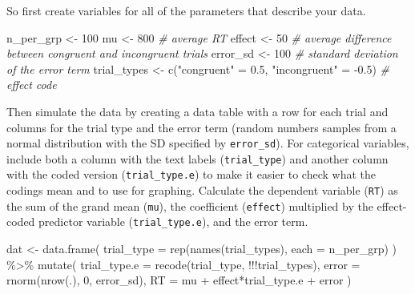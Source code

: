 \documentclass[
  oneside]{book}
\newenvironment{Shaded}{\begin{snugshade}}{\end{snugshade}}
\newcommand{\AttributeTok}[1]{\textcolor[rgb]{0.77,0.63,0.00}{#1}}
\newcommand{\CommentTok}[1]{\textcolor[rgb]{0.56,0.35,0.01}{\textit{#1}}}
\newcommand{\DecValTok}[1]{\textcolor[rgb]{0.00,0.00,0.81}{#1}}
\newcommand{\FloatTok}[1]{\textcolor[rgb]{0.00,0.00,0.81}{#1}}
\newcommand{\FunctionTok}[1]{\textcolor[rgb]{0.00,0.00,0.00}{#1}}
\newcommand{\NormalTok}[1]{#1}
\newcommand{\OtherTok}[1]{\textcolor[rgb]{0.56,0.35,0.01}{#1}}
\newcommand{\SpecialCharTok}[1]{\textcolor[rgb]{0.00,0.00,0.00}{#1}}
\newcommand{\StringTok}[1]{\textcolor[rgb]{0.31,0.60,0.02}{#1}}
\begin{document}
So first create variables for all of the parameters that describe your data.

\begin{Shaded}
\begin{Highlighting}[]
\NormalTok{n\_per\_grp }\OtherTok{\textless{}{-}} \DecValTok{100}
\NormalTok{mu }\OtherTok{\textless{}{-}} \DecValTok{800} \CommentTok{\# average RT}
\NormalTok{effect }\OtherTok{\textless{}{-}} \DecValTok{50} \CommentTok{\# average difference between congruent and incongruent trials}
\NormalTok{error\_sd }\OtherTok{\textless{}{-}} \DecValTok{100} \CommentTok{\# standard deviation of the error term}
\NormalTok{trial\_types }\OtherTok{\textless{}{-}} \FunctionTok{c}\NormalTok{(}\StringTok{"congruent"} \OtherTok{=} \FloatTok{0.5}\NormalTok{, }\StringTok{"incongruent"} \OtherTok{=} \SpecialCharTok{{-}}\FloatTok{0.5}\NormalTok{) }\CommentTok{\# effect code}
\end{Highlighting}
\end{Shaded}

Then simulate the data by creating a data table with a row for each trial and columns for the trial type and the error term (random numbers samples from a normal distribution with the SD specified by \texttt{error\_sd}). For categorical variables, include both a column with the text labels (\texttt{trial\_type}) and another column with the coded version (\texttt{trial\_type.e}) to make it easier to check what the codings mean and to use for graphing. Calculate the dependent variable (\texttt{RT}) as the sum of the grand mean (\texttt{mu}), the coefficient (\texttt{effect}) multiplied by the effect-coded predictor variable (\texttt{trial\_type.e}), and the error term.

\begin{Shaded}
\begin{Highlighting}[]
\NormalTok{dat }\OtherTok{\textless{}{-}} \FunctionTok{data.frame}\NormalTok{(}
  \AttributeTok{trial\_type =} \FunctionTok{rep}\NormalTok{(}\FunctionTok{names}\NormalTok{(trial\_types), }\AttributeTok{each =}\NormalTok{ n\_per\_grp)}
\NormalTok{) }\SpecialCharTok{\%\textgreater{}\%}
  \FunctionTok{mutate}\NormalTok{(}
    \AttributeTok{trial\_type.e =} \FunctionTok{recode}\NormalTok{(trial\_type, }\SpecialCharTok{!!!}\NormalTok{trial\_types),}
    \AttributeTok{error =} \FunctionTok{rnorm}\NormalTok{(}\FunctionTok{nrow}\NormalTok{(.), }\DecValTok{0}\NormalTok{, error\_sd),}
    \AttributeTok{RT =}\NormalTok{ mu }\SpecialCharTok{+}\NormalTok{ effect}\SpecialCharTok{*}\NormalTok{trial\_type.e }\SpecialCharTok{+}\NormalTok{ error}
\NormalTok{  )}
\end{Highlighting}
\end{Shaded}
\end{document}
